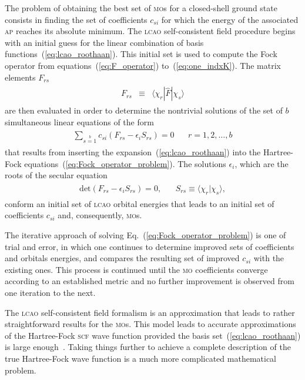 The problem of obtaining the best set of \textsc{mo}s for a
closed-shell ground state consists in finding the set of coefficients
$c_{si}$ for which the energy of the associated \textsc{ap} reaches
its absolute minimum. The \textsc{lcao} self-consistent field
procedure begins with an initial guess for the linear combination of
basis functions~(\ref{eq:lcao_roothaan}). This initial set is used to
compute the Fock operator from equations~(\ref{eq:F_operator})
to~(\ref{eq:one_indxK}). The matrix elements $F_{rs}$
%
\begin{eqnarray}
  \begin{split}
    F_{rs} & \equiv & \langle \chi_{r} | \hat{F} | \chi_{s} \rangle
  \end{split}
  \label{eq:F_matrix}
\end{eqnarray}
%
are then evaluated in order to determine the nontrivial solutions of
the set of $b$ simultaneous linear equations of the form
%
\begin{eqnarray}
  \begin{split}
    \sum\limits_{s=1}\limits^{b} c_{si} (F_{rs} - \epsilon_{i}S_{rs}) = 0 &
    ~~~~ r = 1,2,\dots,b
  \end{split}
  \label{eq:set_linear_eqs}
\end{eqnarray}
%
that results from inserting the expansion~(\ref{eq:lcao_roothaan})
into the Hartree-Fock equations~(\ref{eq:Fock_operator_problem}). The
solutions $\epsilon_{i}$, which are the roots of the secular
equation~\cite{Roothaan_HF,Levine_QChem}
%
\begin{eqnarray}
  \begin{split}
    \mathrm{det} (F_{rs} - \epsilon_{i}S_{rs}) = 0, &
    ~~~~ S_{rs} \equiv \langle \chi_{r} | \chi_{s} \rangle,
  \end{split}
  \label{eq:secular_eigenvalues}
\end{eqnarray}
%
conform an initial set of \textsc{lcao} orbital energies that leads to
an initial set of coefficients $c_{si}$ and, consequently,
\textsc{mo}s.

The iterative approach of solving Eq.~(\ref{eq:Fock_operator_problem})
is one of trial and error, in which one continues to determine
improved sets of coefficients and orbitals energies, and compares the
resulting set of improved $c_{si}$ with the existing ones. This
process is continued until the \textsc{mo} coefficients converge
according to an established metric and no further improvement is
observed from one iteration to the next.

The \textsc{lcao} self-consistent field formalism is an approximation
that leads to rather straightforward results for the
\textsc{mo}s. This model leads to accurate approximations of the
Hartree-Fock \textsc{scf} wave function provided the basis
set~(\ref{eq:lcao_roothaan}) is large
enough~\cite{EllisonShullh2o_1955, Moccia_JCP_2164, Moccia_JCP_2176,
  Moccia_1964}. Taking things further to achieve a complete
description of the true Hartree-Fock wave function is a much more
complicated mathematical problem.


